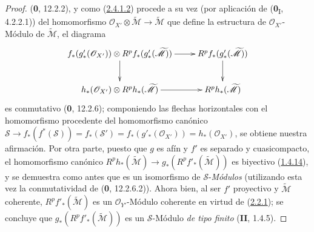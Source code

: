 \begin{proof}
(\textbf{0}, 12.2.2), y como (\hyperref[III.2.4.1.2-fr]{2.4.1.2}) procede
a su vez (por aplicación de (\textbf{0}\textsubscript{I}, 4.2.2.1)) del
homomorfismo
$\mathcal O_{X'}\otimes\widetilde{\mathcal M}
\longrightarrow\widetilde{\mathcal M}$
que define la estructura de $\mathcal O_{X'}$-Módulo de
$\widetilde{\mathcal M}$, el diagrama
\[
\xymatrix{
f_*(g'_*(\mathcal O_{X'}))\otimes
R^pf_*(g'_*(\widetilde{\mathcal M}))
\ar[r]\ar[d] &
R^pf_*(g'_*(\widetilde{\mathcal M}))\ar[d]\\
h_*(\mathcal O_{X'})\otimes R^ph_*(\widetilde{\mathcal M})
\ar[r] & R^ph_*(\widetilde{\mathcal M})
}
\]
es conmutativo (\textbf{0}, 12.2.6); componiendo las flechas horizontales con
el homomorfismo procedente del homomorfismo canónico
$\mathcal S\longrightarrow f_*(f^*(\mathcal S))=f_*(\mathcal S')
=f_*(g'_*(\mathcal O_{X'}))=h_*(\mathcal O_{X'})$,
se obtiene nuestra afirmación. Por otra parte, puesto que $g$ es afín y
$f'$ es separado y cuasicompacto, el homomorfismo canónico
$R^ph_*(\widetilde{\mathcal M})\to
g_*(R^pf'_*(\widetilde{\mathcal M}))$ es biyectivo
(\hyperref[III.1.4.14-fr]{1.4.14}), y se demuestra como antes que
es un isomorfismo de $\mathcal S$-\emph{Módulos} (utilizando esta vez la
conmutatividad de (\textbf{0}, 12.2.6.2)). Ahora bien, al ser $f'$ proyectivo y
$\widetilde{\mathcal M}$ coherente,
$R^pf'_*(\widetilde{\mathcal M})$ es un
$\mathcal O_{Y'}$-Módulo coherente en virtud de
(\hyperref[III.2.2.1-fr]{2.2.1}); se concluye que
$g_*(R^pf'_*(\widetilde{\mathcal M}))$ es un $\mathcal S$-Módulo \emph{de tipo
finito} (\textbf{II}, 1.4.5).


\end{proof}
